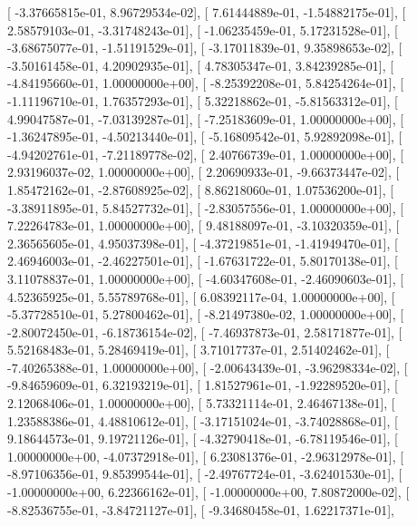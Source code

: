 \documentclass{article}
\begin{document}
       [ -3.37665815e-01,   8.96729534e-02],
       [  7.61444889e-01,  -1.54882175e-01],
       [  2.58579103e-01,  -3.31748243e-01],
       [ -1.06235459e-01,   5.17231528e-01],
       [ -3.68675077e-01,  -1.51191529e-01],
       [ -3.17011839e-01,   9.35898653e-02],
       [ -3.50161458e-01,   4.20902935e-01],
       [  4.78305347e-01,   3.84239285e-01],
       [ -4.84195660e-01,   1.00000000e+00],
       [ -8.25392208e-01,   5.84254264e-01],
       [ -1.11196710e-01,   1.76357293e-01],
       [  5.32218862e-01,  -5.81563312e-01],
       [  4.99047587e-01,  -7.03139287e-01],
       [ -7.25183609e-01,   1.00000000e+00],
       [ -1.36247895e-01,  -4.50213440e-01],
       [ -5.16809542e-01,   5.92892098e-01],
       [ -4.94202761e-01,  -7.21189778e-02],
       [  2.40766739e-01,   1.00000000e+00],
       [  2.93196037e-02,   1.00000000e+00],
       [  2.20690933e-01,  -9.66373447e-02],
       [  1.85472162e-01,  -2.87608925e-02],
       [  8.86218060e-01,   1.07536200e-01],
       [ -3.38911895e-01,   5.84527732e-01],
       [ -2.83057556e-01,   1.00000000e+00],
       [  7.22264783e-01,   1.00000000e+00],
       [  9.48188097e-01,  -3.10320359e-01],
       [  2.36565605e-01,   4.95037398e-01],
       [ -4.37219851e-01,  -1.41949470e-01],
       [  2.46946003e-01,  -2.46227501e-01],
       [ -1.67631722e-01,   5.80170138e-01],
       [  3.11078837e-01,   1.00000000e+00],
       [ -4.60347608e-01,  -2.46090603e-01],
       [  4.52365925e-01,   5.55789768e-01],
       [  6.08392117e-04,   1.00000000e+00],
       [ -5.37728510e-01,   5.27800462e-01],
       [ -8.21497380e-02,   1.00000000e+00],
       [ -2.80072450e-01,  -6.18736154e-02],
       [ -7.46937873e-01,   2.58171877e-01],
       [  5.52168483e-01,   5.28469419e-01],
       [  3.71017737e-01,   2.51402462e-01],
       [ -7.40265388e-01,   1.00000000e+00],
       [ -2.00643439e-01,  -3.96298334e-02],
       [ -9.84659609e-01,   6.32193219e-01],
       [  1.81527961e-01,  -1.92289520e-01],
       [  2.12068406e-01,   1.00000000e+00],
       [  5.73321114e-01,   2.46467138e-01],
       [  1.23588386e-01,   4.48810612e-01],
       [ -3.17151024e-01,  -3.74028868e-01],
       [  9.18644573e-01,   9.19721126e-01],
       [ -4.32790418e-01,  -6.78119546e-01],
       [  1.00000000e+00,  -4.07372918e-01],
       [  6.23081376e-01,  -2.96312978e-01],
       [ -8.97106356e-01,   9.85399544e-01],
       [ -2.49767724e-01,  -3.62401530e-01],
       [ -1.00000000e+00,   6.22366162e-01],
       [ -1.00000000e+00,   7.80872000e-02],
       [ -8.82536755e-01,  -3.84721127e-01],
       [ -9.34680458e-01,   1.62217371e-01],
\end{document}
